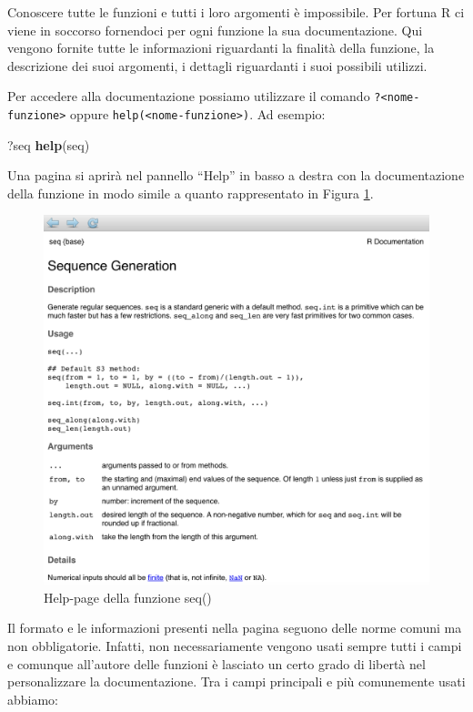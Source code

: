 \documentclass[
]{book}
\newenvironment{Shaded}{\begin{snugshade}}{\end{snugshade}}
\newcommand{\KeywordTok}[1]{\textcolor[rgb]{0.13,0.29,0.53}{\textbf{#1}}}
\newcommand{\NormalTok}[1]{#1}
\begin{document}
Conoscere tutte le funzioni e tutti i loro argomenti è impossibile. Per fortuna R ci viene in soccorso fornendoci per ogni funzione la sua documentazione. Qui vengono fornite tutte le informazioni riguardanti la finalità della funzione, la descrizione dei suoi argomenti, i dettagli riguardanti i suoi possibili utilizzi.

Per accedere alla documentazione possiamo utilizzare il comando \texttt{?\textless{}nome-funzione\textgreater{}} oppure \texttt{help(\textless{}nome-funzione\textgreater{})}. Ad esempio:

\begin{Shaded}
\begin{Highlighting}[]
\NormalTok{?seq}
\KeywordTok{help}\NormalTok{(seq)}
\end{Highlighting}
\end{Shaded}

Una pagina si aprirà nel pannello ``Help'' in basso a destra con la documentazione della funzione in modo simile a quanto rappresentato in Figura \ref{fig:help-page}.

\begin{figure}

{\centering \includegraphics[width=0.85\linewidth]{images/help-seq} 

}

\caption{Help-page della funzione seq()}\label{fig:help-page}
\end{figure}

Il formato e le informazioni presenti nella pagina seguono delle norme comuni ma non obbligatorie. Infatti, non necessariamente vengono usati sempre tutti i campi e comunque all'autore delle funzioni è lasciato un certo grado di libertà nel personalizzare la documentazione. Tra i campi principali e più comunemente usati abbiamo:
\end{document}
